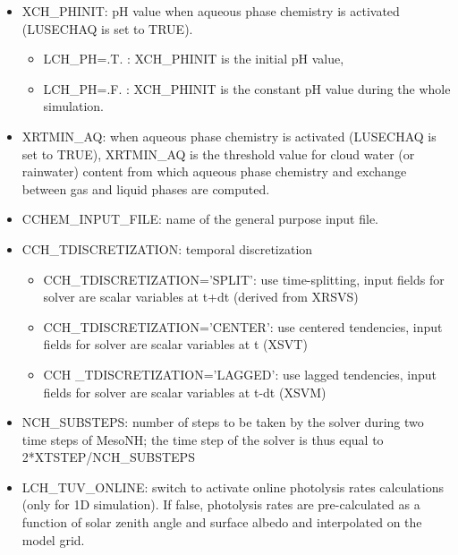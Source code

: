 \begin{itemize}
\item  XCH\_PHINIT: pH value when aqueous phase chemistry is activated (LUSECHAQ is set to TRUE). 
\begin{itemize}
          \item  LCH\_PH=.T. : XCH\_PHINIT is the initial pH value,
          \item  LCH\_PH=.F. : XCH\_PHINIT is the constant pH value during the whole simulation.
\end{itemize}

\item  XRTMIN\_AQ: when aqueous phase chemistry is activated (LUSECHAQ is set to TRUE), XRTMIN\_AQ is the threshold value for cloud water (or rainwater) content from which aqueous phase chemistry and exchange between gas and liquid phases are computed.

\item  CCHEM\_INPUT\_FILE: name of the general purpose input file.

\item  CCH\_TDISCRETIZATION: temporal discretization
\begin{itemize}
           \item CCH\_TDISCRETIZATION='SPLIT': use time-splitting, input fields for solver are scalar variables at t+dt (derived from XRSVS)
           \item CCH\_TDISCRETIZATION='CENTER': use centered tendencies, input fields for solver are scalar variables at t (XSVT)
           \item CCH \_TDISCRETIZATION='LAGGED': use lagged tendencies, input fields for solver are scalar variables at t-dt (XSVM)
\end{itemize}

\item  NCH\_SUBSTEPS: number of steps to be taken by the solver during two time steps of MesoNH; the time step of the solver is thus equal to 2*XTSTEP/NCH\_SUBSTEPS

\item  LCH\_TUV\_ONLINE: switch to activate online photolysis rates calculations (only for 1D simulation). If false, photolysis rates are pre-calculated as a function of solar zenith angle and surface albedo and interpolated on the model grid.


\end{itemize}
